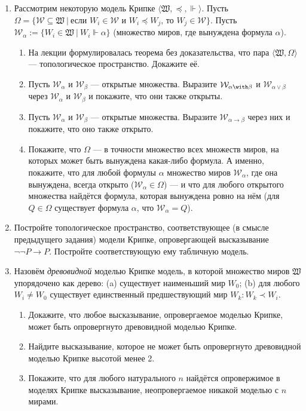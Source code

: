 \documentclass[10pt,a4paper,oneside]{article}
\begin{document}
\begin{enumerate}
\item Рассмотрим некоторую модель Крипке $\langle\mathfrak{W},\preceq,\Vdash\rangle$. 
Пусть $\Omega = \{ \mathcal{W} \subseteq \mathfrak{W}\ |\ \text{если }W_i \in \mathcal{W}\text{ и }W_i \preceq W_j\text{, то } W_j \in \mathcal{W}\}$.
Пусть $\mathcal{W}_\alpha := \{ W_i \in \mathfrak{W}\ |\ W_i \Vdash \alpha \}$ (множество миров, где вынуждена формула $\alpha$).
\begin{enumerate}
\item На лекции формулировалась теорема без доказательства, что пара $\langle\mathfrak{W}, \Omega\rangle$ --- топологическое пространство. Докажите её.
\item Пусть $\mathcal{W}_\alpha$ и $\mathcal{W}_\beta$ --- открытые множества. Выразите $\mathcal{W}_{\alpha\with\beta}$ и $\mathcal{W}_{\alpha\vee\beta}$
через $\mathcal{W}_\alpha$ и $\mathcal{W}_\beta$ и покажите, что они также открыты.
\item Пусть $\mathcal{W}_\alpha$ и $\mathcal{W}_\beta$ --- открытые множества. Выразите $\mathcal{W}_{\alpha\rightarrow\beta}$ через 
них и покажите, что оно также открыто.
\item Покажите, что $\Omega$ --- в точности множество всех множеств миров, на которых может быть вынуждена какая-либо формула.
А именно, покажите, что для любой формулы $\alpha$ множество миров $\mathcal{W}_\alpha$, где она вынуждена, всегда открыто 
($\mathcal{W}_\alpha \in \Omega$) --- и что для любого открытого множества найдётся формула, которая вынуждена ровно на нём
(для $Q \in \Omega$ существует формула $\alpha$, что $\mathcal{W}_\alpha = Q$).
\end{enumerate}

\item Постройте топологическое пространство, соответствующее (в смысле предыдущего задания) модели Крипке, опровергающей
высказывание $\neg\neg P\rightarrow P$.
Постройте соответствующую ему табличную модель.
      
\item Назовём \emph{древовидной} моделью Крипке модель, в которой множество 
миров $\mathfrak{W}$ упорядочено как дерево: (a) существует наименьший мир 
$W_0$; (b) для любого $W_i \ne W_0$ существует единственный предшествующий мир
$W_k: W_k \prec W_i$.
\begin{enumerate}
\item Докажите, что любое высказывание, опровергаемое моделью Крипке, может 
быть опровергнуто древовидной моделью Крипке.
\item Найдите высказывание, которое не может быть опровергнуто древовидной моделью Крипке
высотой менее 2.
\item Покажите, что для любого натурального $n$ найдётся опровержимое в моделях Крипке высказывание,
неопровергаемое никакой моделью с $n$ мирами.
\end{enumerate}


\end{enumerate}
\end{document}
